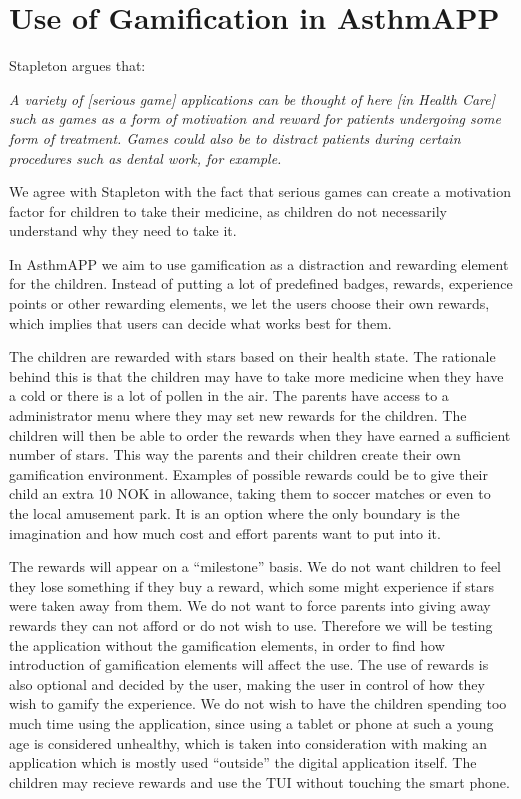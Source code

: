 \section{Use of Gamification in AsthmAPP}
\label{gamificationinapp}

Stapleton argues that:

\textit{A variety of [serious game] applications can be thought of here [in Health Care] such as games as a form of motivation and reward for patients undergoing some form of treatment. Games could also be to distract patients during certain procedures such as dental work, for example.}\cite{stapleton2004serious}


We agree with Stapleton with the fact that serious games can create a motivation factor for children  to take their medicine, as children do not necessarily understand why they need to take it. 


In AsthmAPP we aim to use gamification as a distraction and rewarding element for the children. Instead of putting a lot of predefined badges, rewards, experience points or other rewarding elements, we let the users choose their own rewards, which implies that users can decide what works best for them.  
 

The children are rewarded with stars based on their health state. The rationale behind this is that the children may have to take more medicine when they have a cold or there is a lot of pollen in the air. The parents have access to a administrator menu where they may set new rewards for the children. The children will then be able to order the rewards when they have earned a sufficient number of stars. This way the parents and their children create their own gamification environment. Examples of possible rewards could be to give their child an extra 10 NOK in allowance, taking them to soccer matches or even to the local amusement park. It is an option where the only boundary is the imagination and how much cost and effort parents want to put into it.    


The rewards will appear on a ``milestone'' basis. We do not want children to feel they lose something if they buy a reward, which some might experience if stars were taken away from them. We do not want to force parents into giving away rewards they can not afford or do not wish to use. Therefore we will be testing the application without the gamification elements, in order to find how introduction of gamification elements will affect the use. The use of rewards is also optional and decided by the user, making the user in control of how they wish to gamify the experience. 
We do not wish to have the children spending too much time using the application, since using a tablet or phone at such a young age is considered unhealthy, which is taken into consideration with making an application which is mostly used ``outside'' the digital application itself. The children may recieve rewards and use the TUI without touching the smart phone.

